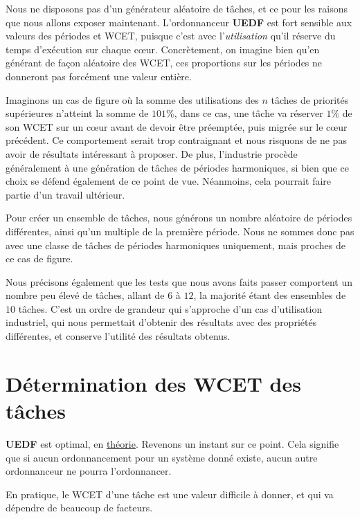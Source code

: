 Nous ne disposons pas d'un générateur aléatoire de tâches, et ce pour les raisons que nous allons exposer maintenant.
L'ordonnanceur \textbf{UEDF} est fort sensible aux valeurs des périodes et WCET, puisque 
c'est avec l'\textit{utilisation} qu'il réserve du temps d'exécution sur chaque cœur. 
Concrètement, on imagine bien qu'en générant de façon aléatoire des WCET, ces proportions sur les 
périodes ne donneront pas forcément une valeur entière.\newline

Imaginons un cas de figure où la somme des utilisations des $n$ tâches de priorités supérieures 
n'atteint la somme de $101\%$, dans ce cas, une tâche va réserver $1\%$ de son WCET 
sur un cœur avant de devoir être préemptée, puis migrée sur le cœur précédent. Ce comportement 
serait trop contraignant et nous risquons de ne pas avoir de résultats intéressant à 
proposer. De plus, l'industrie procède généralement à une génération de tâches de périodes harmoniques, 
si bien que ce choix se défend également de ce point de vue.
Néanmoins, cela pourrait faire partie d'un travail ultérieur.\newline

Pour créer un ensemble de tâches, nous générons un nombre aléatoire de périodes différentes, 
ainsi qu'un multiple de la première période. Nous ne sommes donc pas 
avec une classe de tâches de périodes harmoniques uniquement, 
mais proches de ce cas de figure.\newline

Nous précisons également que les tests que nous avons faits passer comportent 
un nombre peu élevé de tâches, allant de $6$ à $12$, la majorité étant des 
ensembles de $10$ tâches. C'est un ordre de grandeur qui s'approche d'un cas d'utilisation industriel, 
qui nous permettait d'obtenir des résultats avec des propriétés différentes, et conserve 
l'utilité des résultats obtenus.


\section{Détermination des WCET des tâches}\label{methodo}
	\textbf{UEDF} est optimal, en \underline{théorie}. Revenons un instant sur ce point. 
	Cela signifie que si aucun ordonnancement pour un système donné existe, 
	aucun autre ordonnanceur ne pourra l'ordonnancer.\newline

	En pratique, le WCET d'une tâche est une valeur difficile à donner, et qui va dépendre de 
	beaucoup de facteurs.\newline
	
